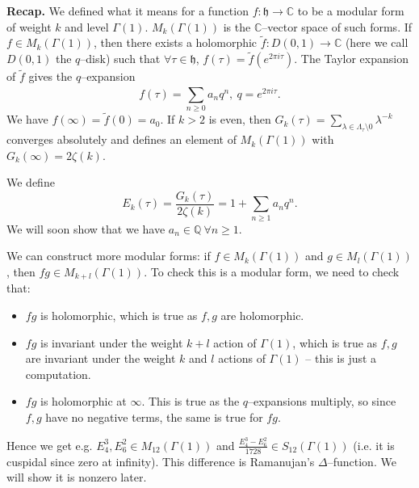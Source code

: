 \documentclass{article}
\theoremstyle{definition}
\begin{document}

\textbf{Recap.} We defined what it means for a function $f : \mathfrak{h} \to \mathbb{C}$ to be a modular form of weight $k$ and level $\Gamma(1)$. $M_k(\Gamma(1))$ is the $\mathbb{C}$--vector space of such forms. If $f \in M_k(\Gamma(1))$, then there exists a holomorphic $\tilde{f} : D(0,1) \to \mathbb{C}$ (here we call $D(0,1)$ the $q$--disk) such that $\forall \tau \in \mathfrak{h}$, $f(\tau) = \tilde{f}(e^{2\pi i \tau})$. The Taylor expansion of $\tilde{f}$ gives the $q$--expansion \[
f(\tau) = \sum_{n\ge 0}^{} a_nq^n, ~ q = e^{2\pi i \tau}.
\]
We have $f(\infty) = \tilde{f}(0)=a_0$. If $k>2$ is even, then $G_k(\tau) = \sum_{ \lambda \in \Lambda_{\tau}\setminus 0}^{} \lambda^{-k}$ converges absolutely and defines an element of $M_k(\Gamma(1))$ with $G_k(\infty)= 2\zeta(k)$.
\vspace{1mm}
 
We define $$E_k(\tau) = \frac{G_k(\tau)}{2\zeta(k)} = 1 + \sum_{n\ge 1}^{} a_nq^n.$$ We will soon show that we have $a_n \in \mathbb{Q} ~\forall n\ge 1$.
\vspace{1mm}
 
We can construct more modular forms: if $f \in M_k(\Gamma(1))$ and $g \in M_l(\Gamma(1))$, then $fg \in M_{k+l}(\Gamma(1))$. To check this is a modular form, we need to check that:
\begin{itemize}
    \item $fg$ is holomorphic, which is true as $f, g$ are holomorphic.
    \item $fg$ is invariant under the weight $k+l$ action of $\Gamma(1)$, which is true as $f,g$ are invariant under the weight $k$ and $l$ actions of $\Gamma(1)$ -- this is just a computation.
    \item $fg$ is holomorphic at $\infty$. This is true as the $q$--expansions multiply, so since $f, g$ have no negative terms, the same is true for $fg$.
\end{itemize}
Hence we get e.g. $E_4^3, E_6^2 \in M_{12}(\Gamma(1))$ and $\frac{E_4^3-E_6^2}{1728} \in S_{12}(\Gamma(1))$ (i.e. it is cuspidal since zero at infinity). This difference is Ramanujan's $\Delta$--function. We will show it is nonzero later. 
\vspace{1mm}
 
\end{document}

